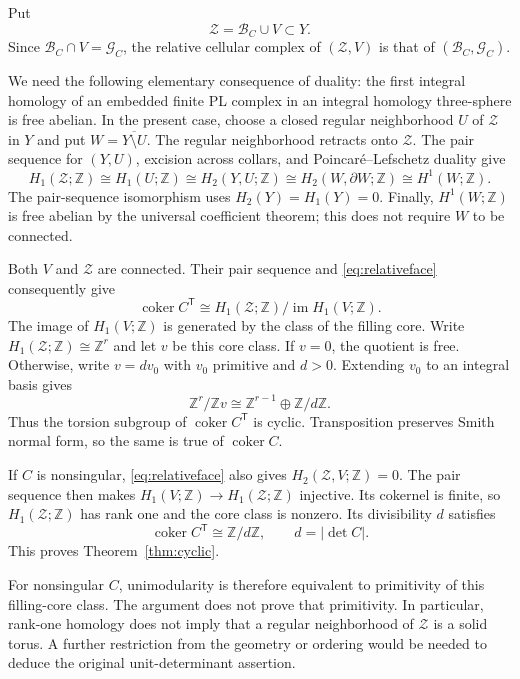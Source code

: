 \documentclass[11pt]{article}
\theoremstyle{definition}\newtheorem{definition}[theorem]{Definition}
\theoremstyle{remark}\newtheorem{remark}[theorem]{Remark}
\DeclareMathOperator{\im}{im}
\DeclareMathOperator{\coker}{coker}
\newcommand{\Z}{\mathbb Z}
\begin{document}
Put
\[
 \mathcal Z=\mathcal B_C\cup V\subset Y.
\]
Since $\mathcal B_C\cap V=\mathcal G_C$, the relative cellular
complex of $(\mathcal Z,V)$ is that of
$(\mathcal B_C,\mathcal G_C)$.

We need the following elementary consequence of duality: the first
integral homology of an embedded finite PL complex in an integral
homology three-sphere is free abelian. In the present case, choose a
closed regular neighborhood $U$ of $\mathcal Z$ in $Y$ and put
$W=\overline{Y\setminus U}$. The regular neighborhood retracts onto
$\mathcal Z$. The pair sequence for $(Y,U)$, excision across collars,
and Poincar\'e--Lefschetz duality give
\[
 H_1(\mathcal Z;\Z)\cong H_1(U;\Z)
 \cong H_2(Y,U;\Z)
 \cong H_2(W,\partial W;\Z)
 \cong H^1(W;\Z).
\]
The pair-sequence isomorphism uses $H_2(Y)=H_1(Y)=0$. Finally,
$H^1(W;\Z)$ is free abelian by the universal coefficient theorem; this
does not require $W$ to be connected.

Both $V$ and $\mathcal Z$ are connected. Their pair sequence and
\eqref{eq:relativeface} consequently give
\begin{equation}
 \coker C^{\mathsf T}
 \cong H_1(\mathcal Z;\Z)/\im H_1(V;\Z).
 \label{eq:corequotient}
\end{equation}
The image of $H_1(V;\Z)$ is generated by the class of the filling core.
Write $H_1(\mathcal Z;\Z)\cong\Z^r$ and let $v$ be this core
class. If $v=0$, the quotient is free. Otherwise, write $v=dv_0$ with
$v_0$ primitive and $d>0$. Extending $v_0$ to an integral basis gives
\[
 \Z^r/\Z v\cong\Z^{r-1}\oplus\Z/d\Z.
\]
Thus the torsion subgroup of $\coker C^{\mathsf T}$ is cyclic.
Transposition preserves Smith normal form, so the same is true of
$\coker C$.

If $C$ is nonsingular, \eqref{eq:relativeface} also gives
$H_2(\mathcal Z,V;\Z)=0$. The pair sequence then makes
$H_1(V;\Z)\to H_1(\mathcal Z;\Z)$ injective. Its cokernel is finite,
so $H_1(\mathcal Z;\Z)$ has rank one and the core class is nonzero.
Its divisibility $d$ satisfies
\[
 \coker C^{\mathsf T}\cong\Z/d\Z,\qquad d=|\det C|.
\]
This proves Theorem~\ref{thm:cyclic}.

For nonsingular $C$, unimodularity is therefore equivalent to primitivity
of this filling-core class. The argument does not prove that primitivity.
In particular, rank-one homology does not imply that a regular
neighborhood of $\mathcal Z$ is a solid torus. A further restriction
from the geometry or ordering would be needed to deduce the original
unit-determinant assertion.
\end{document}
